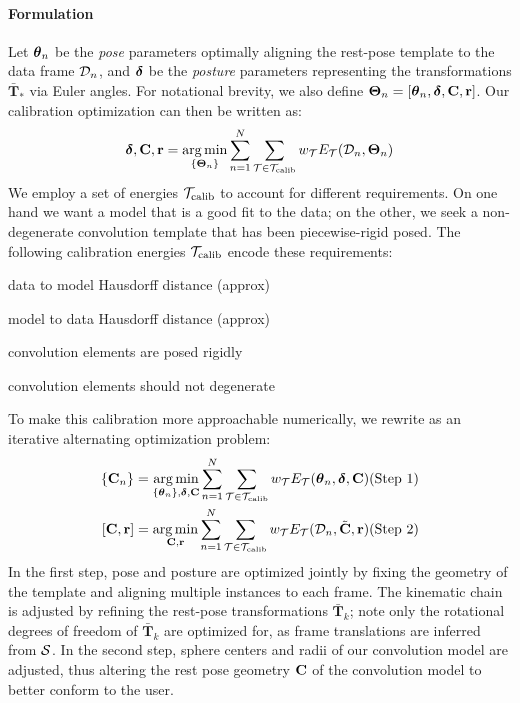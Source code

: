 \paragraph{Formulation}
Let $\boldsymbol{\theta}_n$ be the \emph{pose} parameters optimally aligning the rest-pose template to the data frame $\mathcal{D}_n$, and $\boldsymbol{\delta}$ be the \emph{posture} parameters representing the transformations $\mathbf{\bar{T}}_*$ via Euler angles. For notational brevity, we also define $\boldsymbol{\Theta}_n=[\boldsymbol{\theta}_n, \boldsymbol{\delta}, {\mathbf{C}}, {\mathbf{r}}]$. Our calibration optimization can then be written as:
% 
\begin{eqnarray}
\boldsymbol{\delta}, {\mathbf{C}}, {\mathbf{r}} = \operatorname*{arg\,min}_{\{\boldsymbol{\Theta}_n\}}
\sum_{n=1}^N 
\sum_{\mathcal{T} \in {\mathcal{T}_\text{calib}}} 
w_\mathcal{T} E_\mathcal{T}(\mathcal{D}_n, \boldsymbol{\Theta}_n)
\label{eq:calibration}
\end{eqnarray}
% 
We employ a set of energies ${\mathcal{T}_\text{calib}}$ to account for different requirements. On one hand we want a model that is a good fit to the data; on the other, we seek a non-degenerate convolution template that has been piecewise-rigid posed. The following calibration energies ${\mathcal{T}_\text{calib}}$ encode these requirements:
% 
\begin{description}[labelsep=0em,labelwidth=.4in,labelindent=1cm]
\item[d2m] data to model Hausdorff distance (approx)
\item[m2d] model to data Hausdorff distance (approx)
\item[rigid] convolution elements are posed rigidly
\item[valid] convolution elements should not degenerate
\end{description}
% 
To make this calibration more approachable numerically, we rewrite  as an iterative alternating optimization problem:
% 
\begin{eqnarray}
{\{\mathbf{C}_n\}} = 
\operatorname*{arg\,min}_{{\{\boldsymbol{\theta}_n\}},\boldsymbol{\delta},{\mathbf{C}}} 
\sum_{n=1}^N 
\sum_{\mathcal{T} \in {\mathcal{T}_\text{calib}}}
w_\mathcal{T} E_\mathcal{T}(\boldsymbol{\theta}_n, \boldsymbol{\delta}, {\mathbf{C}}) 
& \text{(Step 1)}
\label{eq:step1}
\\
\left[ {\mathbf{C}}, {\mathbf{r}} \right] =
\operatorname*{arg\,min}_{{\mathbf{C}}, {\mathbf{r}}} 
\sum_{n=1}^N 
\sum_{\mathcal{T} \in {\mathcal{T}_\text{calib}}}
w_\mathcal{T} E_\mathcal{T}(\mathcal{D}_n, \tilde{{\mathbf{C}}}, {\mathbf{r}})
& \text{(Step 2)}
\label{eq:step2}
\end{eqnarray}
% 
In the first step, pose and posture are optimized jointly by fixing the geometry of the template and aligning multiple instances to each frame. The kinematic chain is adjusted by refining the rest-pose transformations $\mathbf{\bar{T}}_k$; note only the rotational degrees of freedom of $\mathbf{\bar{T}}_k$ are optimized for, as frame translations are inferred from $\mathcal{S}$. 
% 
In the second step, sphere centers and radii of our convolution model are adjusted, thus altering the rest pose geometry ${\mathbf{C}}$ of the convolution model to better conform to the user.


